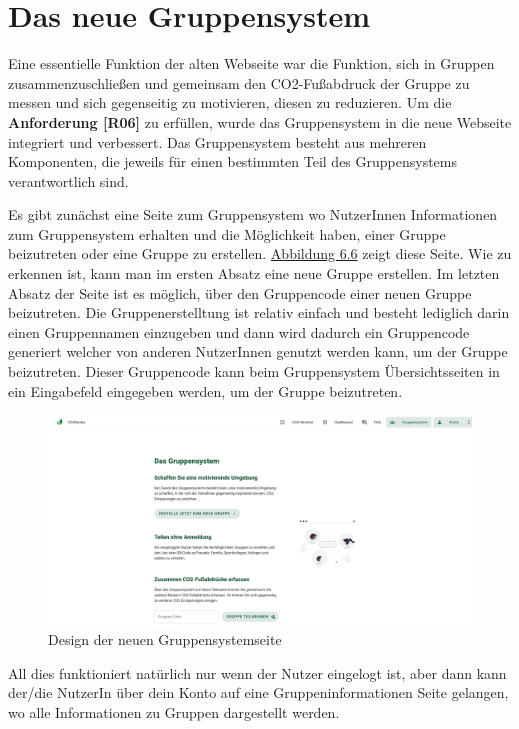\section{Das neue Gruppensystem}

Eine essentielle Funktion der alten Webseite war die Funktion, sich in Gruppen zusammenzuschließen und gemeinsam den CO2-Fußabdruck der Gruppe zu messen und sich gegenseitig zu motivieren, diesen zu reduzieren. Um die \textbf{Anforderung [R06]} zu erfüllen, wurde das Gruppensystem in die neue Webseite integriert und verbessert. Das Gruppensystem besteht aus mehreren Komponenten, die jeweils für einen bestimmten Teil des Gruppensystems verantwortlich sind.

Es gibt zunächst eine Seite zum Gruppensystem wo NutzerInnen Informationen zum Gruppensystem erhalten und die Möglichkeit haben, einer Gruppe beizutreten oder eine Gruppe zu erstellen.
\hyperref[fig:gruppensystem-neues-design]{Abbildung 6.6} zeigt diese Seite.
Wie zu erkennen ist, kann man im ersten Absatz eine neue Gruppe erstellen.
Im letzten Absatz der Seite ist es möglich, über den Gruppencode einer neuen Gruppe beizutreten.
Die Gruppenerstelltung ist relativ einfach und besteht lediglich darin einen Gruppennamen einzugeben und dann wird dadurch ein Gruppencode generiert welcher von anderen NutzerInnen genutzt werden kann, um der Gruppe beizutreten. Dieser Gruppencode kann beim Gruppensystem Übersichtsseiten in ein Eingabefeld eingegeben werden, um der Gruppe beizutreten.
\begin{figure}[H]
    \centering
    \includegraphics[width=1\textwidth]{images/06/gruppensystem-design.png}
    \caption{Design der neuen Gruppensystemseite}
    \label{fig:gruppensystem-neues-design}
\end{figure}

All dies funktioniert natürlich nur wenn der Nutzer eingelogt ist, aber dann kann der/die NutzerIn über dein Konto auf eine Gruppeninformationen Seite gelangen, wo alle Informationen zu Gruppen dargestellt werden.

